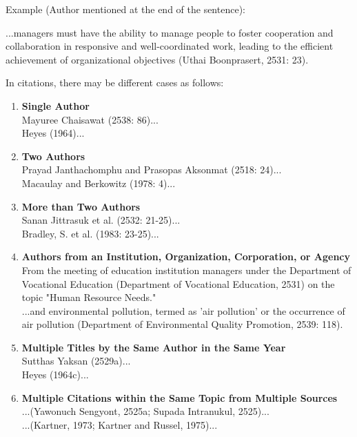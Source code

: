 Example (Author mentioned at the end of the sentence):

...managers must have the ability to manage people to foster cooperation and collaboration in responsive and well-coordinated work, leading to the efficient achievement of organizational objectives (Uthai Boonprasert, 2531: 23).

In citations, there may be different cases as follows:
\begin{enumerate}
        \item \textbf{Single Author} \\
        Mayuree Chaisawat (2538: 86)... \\
        Heyes (1964)...

        \item \textbf{Two Authors} \\
        Prayad Janthachomphu and Prasopas Aksonmat (2518: 24)... \\
        Macaulay and Berkowitz (1978: 4)...

        \item \textbf{More than Two Authors} \\
        Sanan Jittrasuk et al. (2532: 21-25)... \\
        Bradley, S. et al. (1983: 23-25)...

        \item \textbf{Authors from an Institution, Organization, Corporation, or Agency} \\
        From the meeting of education institution managers under the Department of Vocational Education (Department of Vocational Education, 2531) on the topic "Human Resource Needs." \\
        ...and environmental pollution, termed as 'air pollution' or the occurrence of air pollution (Department of Environmental Quality Promotion, 2539: 118).

        \item \textbf{Multiple Titles by the Same Author in the Same Year} \\
        Sutthas Yaksan (2529a)... \\
        Heyes (1964c)...

        \item \textbf{Multiple Citations within the Same Topic from Multiple Sources} \\
        ...(Yawonuch Sengyont, 2525a; Supada Intranukul, 2525)... \\
        ...(Kartner, 1973; Kartner and Russel, 1975)...


\end{enumerate}
